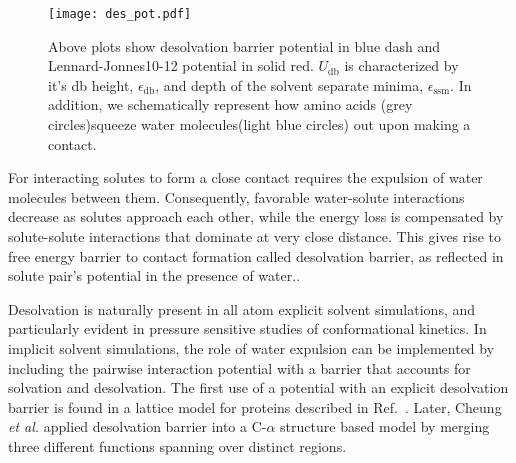 \documentclass[../talant.diss.submit.tex]{subfiles}
\begin{document}
\begin{figure}[h!]
  \begin{centering}
    \texttt{[image: des\_pot.pdf]}
    \caption{ Above plots show desolvation barrier potential in blue dash and
      Lennard-Jonnes10-12 potential in solid red. $U_{\mathrm{db}}$ is characterized by it's 
      db height, $\epsilon_{\mathrm{db}}$,%
      and depth of the solvent separate minima, $\epsilon_{\mathrm{ssm}}$. %
      In addition, we schematically represent how amino acids (grey circles)squeeze water
      molecules(light blue circles) out upon making a contact.}                
    \label{fig:des_pot}                                                                                  
  \end{centering}                                                                                          
\end{figure}
%
%

For interacting solutes to form a close contact requires the expulsion of  water molecules between them.
Consequently, favorable water-solute interactions
decrease as solutes approach each other, while the energy loss is compensated by solute-solute
interactions that dominate at very close distance\cite{liu:05}.
This gives rise to free energy barrier to contact formation called desolvation barrier,
as reflected in solute pair's potential in the presence of water.\cite{rank:97d}.%

Desolvation is naturally present in all atom explicit solvent simulations, and
particularly evident in pressure sensitive studies of conformational kinetics.
In implicit solvent simulations, the role of water expulsion can be implemented
by including the pairwise interaction potential with a barrier that accounts for
solvation and desolvation. The first use of a potential with an explicit
desolvation barrier is found in a lattice model for proteins described in Ref.~\cite{Hillson:1999}. 
Later, Cheung \textit{et al.} applied desolvation barrier into a C-$\alpha$ structure based model
by  merging three different functions spanning over distinct regions.\cite{cheung:02}
\end{document}
